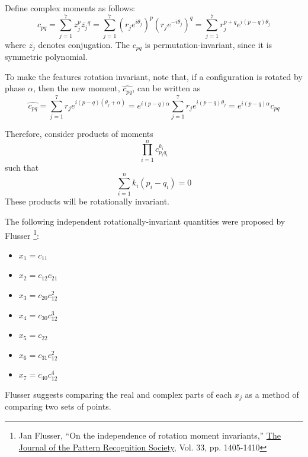 Define complex moments as follows:
\begin{equation}
c_{pq}=\sum_{j=1}^{7}z_{j}^{p}\overline{z_{j}}^{q}=\sum_{j=1}^{7}\left(r_{j}e^{i\theta_j}\right)^{p}\left(r_{j}e^{-i\theta_j}\right)^{q}=\sum_{j=1}^{7}r_{j}^{p+q}e^{i(p-q)\theta_j}
\end{equation}
where $\overline{z_j}$ denotes conjugation. The $c_{pq}$ is permutation-invariant, since it is symmetric polynomial.

To make the features rotation invariant, note that, if a configuration is rotated by phase $\alpha$, then the new moment, $\hat{c_{pq}}$, can be written as
\begin{equation}
\hat{c_{pq}}=\sum_{j=1}^{7}r_{j}e^{i(p-q)(\theta_j+\alpha)}=e^{i(p-q)\alpha}\sum_{j=1}^{7}r_{j}e^{i(p-q)\theta_j}=e^{i(p-q)\alpha}c_{pq}
\end{equation}

Therefore, consider products of moments
\begin{equation}
\prod_{i=1}^{n}c_{p_{i}q_{i}}^{k_i}
\end{equation}
such that 
\begin{equation}
\sum_{i=1}^{n}k_i(p_i-q_i)=0
\end{equation}
These products will be rotationally invariant.

The following independent rotationally-invariant quantities were proposed by Flusser \footnote{Jan Flusser, ``On the independence of rotation moment invariants,'' \underline{The Journal of the Pattern Recognition Society}, Vol. 33, pp. 1405-1410}:
\begin{itemize}
\item $x_1=c_{11}$
\item $x_2=c_{12}c_{21}$
\item $x_3=c_{20}c_{12}^2$
\item $x_4=c_{30}c_{12}^3$
\item $x_5=c_{22}$
\item $x_6=c_{31}c_{12}^2$
\item $x_7=c_{40}c_{12}^{4}$
\end{itemize}
Flusser suggests comparing the real and complex parts of each $x_{j}$ as a method of comparing two sets of points.

